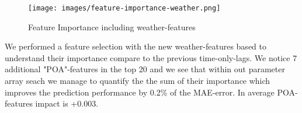 \begin{figure}[H]
    \centering
    \texttt{[image: images/feature-importance-weather.png]}
    \caption{Feature Importance including weather-features}
    \label{fig:feature-importance-weather}
\end{figure}

We performed a feature selection with the new weather-features based to understand their importance 
compare to the previous time-only-lags. We notice 7 additional "POA"-features in the top 20 and we see 
that within out parameter array seach we manage to quantify the the sum of their importance which 
improves the prediction performance by 0.2\% of the MAE-error. In average POA-features impact is +0.003.




